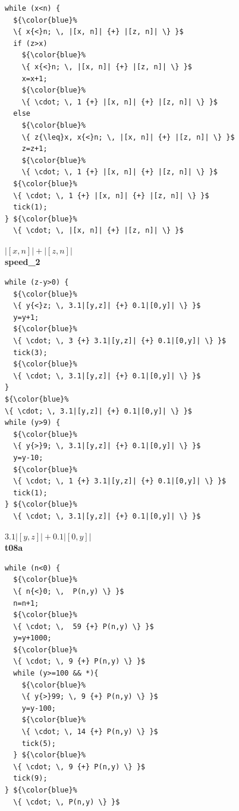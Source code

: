 \documentclass[nocopyrightspace,preprint,pldi]{sigplanconf-pldi15}
\begin{document}
\begin{figure}
\begin{minipage}[b]{\progwidth}
\begin{center}
\begin{lstlisting}
while (x<n) {
  ${\color{blue}%
  \{ x{<}n; \, |[x, n]| {+} |[z, n]| \} }$
  if (z>x)
    ${\color{blue}%
    \{ x{<}n; \, |[x, n]| {+} |[z, n]| \} }$
    x=x+1;
    ${\color{blue}%
    \{ \cdot; \, 1 {+} |[x, n]| {+} |[z, n]| \} }$
  else
    ${\color{blue}%
    \{ z{\leq}x, x{<}n; \, |[x, n]| {+} |[z, n]| \} }$
    z=z+1;
    ${\color{blue}%
    \{ \cdot; \, 1 {+} |[x, n]| {+} |[z, n]| \} }$
  ${\color{blue}%
  \{ \cdot; \, 1 {+} |[x, n]| {+} |[z, n]| \} }$
  tick(1);
} ${\color{blue}%
  \{ \cdot; \, |[x, n]| {+} |[z, n]| \} }$
   \end{lstlisting}
\vspace{-2.5ex}
$|[x, n]| + |[z, n]|$
\\[.4\baselineskip]
      {\bf speed\_2}
    \end{center}
  \end{minipage}
%
\hfill
%
  \begin{minipage}[b]{\progwidth}
    \begin{center}
   \begin{lstlisting}
while (z-y>0) {
  ${\color{blue}%
  \{ y{<}z; \, 3.1|[y,z]| {+} 0.1|[0,y]| \} }$
  y=y+1;
  ${\color{blue}%
  \{ \cdot; \, 3 {+} 3.1|[y,z]| {+} 0.1|[0,y]| \} }$
  tick(3);
  ${\color{blue}%
  \{ \cdot; \, 3.1|[y,z]| {+} 0.1|[0,y]| \} }$
}
${\color{blue}%
\{ \cdot; \, 3.1|[y,z]| {+} 0.1|[0,y]| \} }$
while (y>9) {
  ${\color{blue}%
  \{ y{>}9; \, 3.1|[y,z]| {+} 0.1|[0,y]| \} }$
  y=y-10;
  ${\color{blue}%
  \{ \cdot; \, 1 {+} 3.1|[y,z]| {+} 0.1|[0,y]| \} }$
  tick(1);
} ${\color{blue}%
  \{ \cdot; \, 3.1|[y,z]| {+} 0.1|[0,y]| \} }$
   \end{lstlisting}
\vspace{-2.5ex}
$3.1|[y,z]| + 0.1|[0,y]|$
\\[.4\baselineskip]
      {\bf t08a}
    \end{center}
  \end{minipage}
%
\hfill
%
%
%
  \begin{minipage}[b]{\progwidth}
    \begin{center}
   \begin{lstlisting}
while (n<0) {
  ${\color{blue}%
  \{ n{<}0; \,  P(n,y) \} }$
  n=n+1;
  ${\color{blue}%
  \{ \cdot; \,  59 {+} P(n,y) \} }$
  y=y+1000;
  ${\color{blue}%
  \{ \cdot; \, 9 {+} P(n,y) \} }$
  while (y>=100 && *){
    ${\color{blue}%
    \{ y{>}99; \, 9 {+} P(n,y) \} }$
    y=y-100;
    ${\color{blue}%
    \{ \cdot; \, 14 {+} P(n,y) \} }$
    tick(5);
  } ${\color{blue}%
  \{ \cdot; \, 9 {+} P(n,y) \} }$
  tick(9);
} ${\color{blue}%
  \{ \cdot; \, P(n,y) \} }$

\end{lstlisting}
\end{center}
\end{minipage}
\end{figure}
\end{document}
